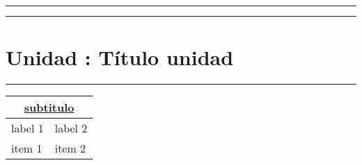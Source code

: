 \documentclass[../main.tex]{subfiles}
\begin{document}
\vspace{0.2in}
\hrule
\vspace{0.2in}
\hrule
\section{Unidad : Título unidad}
\hrule
\vspace{0.1in}
\begin{tabularx}{\textwidth}{|X|X|}
  \hline
  \multicolumn{2}{|c|}{\underline{\textbf{subtitulo}}} \\
  \hline
  label 1 & label 2                                    \\
  \hline
  item 1  & item 2                                     \\
  \hline
\end{tabularx}
\end{document}
